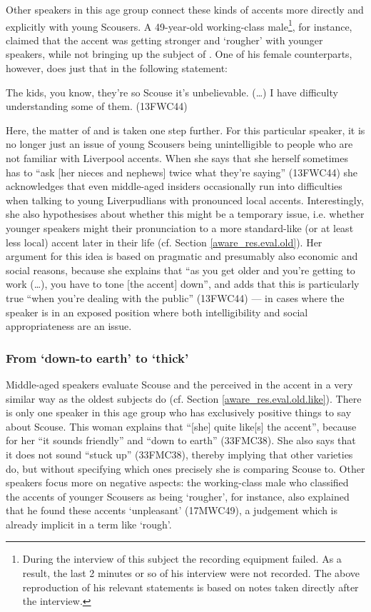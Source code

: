Other speakers in this age group connect these kinds of accents more directly and explicitly with young Scousers.
A 49-year-old working-class male\footnote{During the interview of this subject the recording equipment failed. As a result, the last 2 minutes or so of his interview were not recorded. The above reproduction of his relevant statements is based on notes taken directly after the interview.}, for instance, claimed that the accent was getting stronger and `rougher' with younger speakers, while not bringing up the subject of .
One of his female counterparts, however, does just that in the following statement:
\begin{example}
	The kids, you know, they're so Scouse it's unbelievable. (\ldots) I have difficulty understanding some of them. (13FWC44)
\end{example}
Here, the matter of  and  is taken one step further.
For this particular speaker, it is no longer just an issue of young Scousers being unintelligible to people who are not familiar with Liverpool accents.
When she says that she herself sometimes has to ``ask [her nieces and nephews] twice what they're saying'' (13FWC44) she acknowledges that even middle-aged insiders occasionally run into difficulties when talking to young Liverpudlians with pronounced local accents.
Interestingly, she also hypothesises about whether this might be a temporary issue, i.e. whether younger speakers might  their pronunciation to a more standard-like (or at least less local) accent later in their life (cf. Section \ref{aware_res.eval.old}).
Her argument for this idea is based on pragmatic and presumably also economic and social reasons, because she explains that ``as you get older and you're getting to work (\ldots), you have to tone [the accent] down'', and adds that this is particularly true ``when you're dealing with the public'' (13FWC44) --- in cases where the speaker is in an exposed position where both intelligibility and social appropriateness are an issue.

\subsubsection{From `down-to earth' to `thick'}
\label{aware_res.eval.mid.like}

Middle-aged speakers evaluate Scouse and the perceived  in the accent in a very similar way as the oldest subjects do (cf. Section \ref{aware_res.eval.old.like}).
There is only one speaker in this age group who has exclusively positive things to say about Scouse.
This woman explains that ``[she] quite like[s] the accent'', because for her ``it sounds friendly'' and ``down to earth'' (33FMC38).
She also says that it does not sound ``stuck up'' (33FMC38), thereby implying that other varieties do, but without specifying which ones precisely she is comparing Scouse to.
Other speakers focus more on negative aspects: the working-class male who classified the accents of younger Scousers as being `rougher', for instance, also explained that he found these accents `unpleasant' (17MWC49), a judgement which is already implicit in a term like `rough'.

